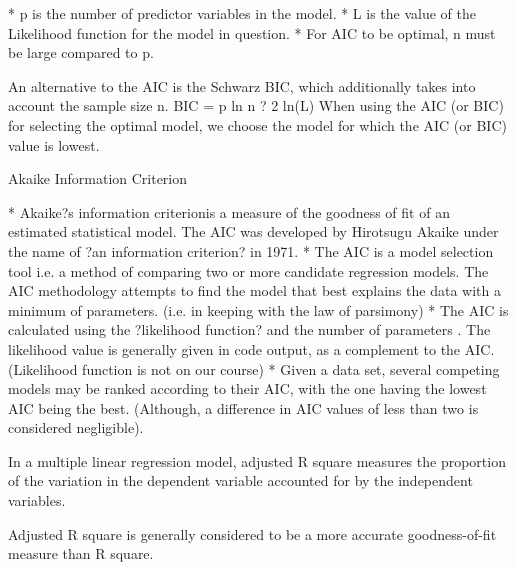 
	* p is the number of predictor variables in the model.
	* L is the value of the Likelihood function for the model in question.
	* For AIC to be optimal, n must be large compared to p.


An alternative to the AIC is the Schwarz BIC, which additionally takes into account the
sample size n.
BIC = p ln n ? 2 ln(L)
When using the AIC (or BIC) for selecting the optimal model, we choose the model for which
the AIC (or BIC) value is lowest.


Akaike Information Criterion


	* Akaike?s information criterionis a measure of the goodness of fit of an estimated statistical
	model. The AIC was developed by Hirotsugu Akaike under the name of ?an information
	criterion? in 1971.
	* The AIC is a model selection tool i.e. a method of comparing two or more candidate
	regression models. The AIC methodology attempts to find the model that best explains
	the data with a minimum of parameters. (i.e. in keeping with the law of parsimony)
	* The AIC is calculated using the ?likelihood function? and the number of parameters .
	The likelihood value is generally given in code output, as a complement to the AIC.
	(Likelihood function is not on our course)
	* Given a data set, several competing models may be ranked according to their AIC, with
	the one having the lowest AIC being the best. (Although, a difference in AIC values of
	less than two is considered negligible).
	



In a multiple linear regression model, adjusted R square measures the proportion of the variation in the dependent variable 
accounted for by the independent variables.  

Adjusted R square is generally considered to be a more accurate goodness-of-fit measure than R square.

